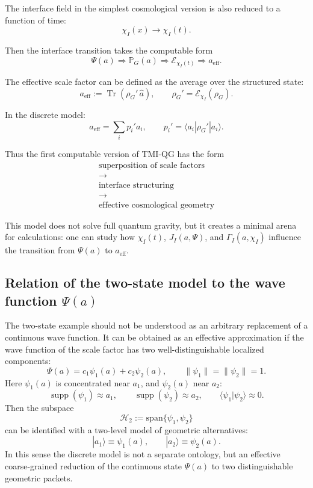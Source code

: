 \documentclass[12pt,a4paper]{article}
\DeclareMathOperator{\Tr}{Tr}
\DeclareMathOperator{\supp}{supp}
\newcommand{\Hilb}{\mathcal H}
\newcommand{\Prob}{\mathbb P}
\newcommand{\Eff}{\mathrm{eff}}
\begin{document}
The interface field in the simplest cosmological version is also reduced to a function of time:
\[
\boxed{
\chi_I(x)
\longrightarrow
\chi_I(t).
}
\]

Then the interface transition takes the computable form
\[
\boxed{
\Psi(a)
\Rightarrow
\Prob_G(a)
\Rightarrow
\mathcal E_{\chi_I(t)}
\Rightarrow
 a_{\Eff}.
}
\]

The effective scale factor can be defined as the average over the structured state:
\[
\boxed{
a_{\Eff}
:=
\Tr(\rho_G'\,\widehat a),
\qquad
\rho_G'=\mathcal E_{\chi_I}(\rho_G).
}
\]

In the discrete model:
\[
\boxed{
a_{\Eff}
=
\sum_i p_i' a_i,
\qquad
p_i'=\langle a_i|\rho_G'|a_i\rangle.
}
\]

Thus the first computable version of TMI-QG has the form
\[
\boxed{
\begin{gathered}
\text{superposition of scale factors}\\
\longrightarrow\\
\text{interface structuring}\\
\longrightarrow\\
\text{effective cosmological geometry}
\end{gathered}
}
\]

This model does not solve full quantum gravity, but it creates a minimal arena for calculations: one can study how $\chi_I(t)$, $J_I(a,\Psi)$, and $\Gamma_I(a,\chi_I)$ influence the transition from $\Psi(a)$ to $a_{\Eff}$.

\subsection{Relation of the two-state model to the wave function \texorpdfstring{$\Psi(a)$}{Psi(a)}}

The two-state example should not be understood as an arbitrary replacement of a continuous wave function. It can be obtained as an effective approximation if the wave function of the scale factor has two well-distinguishable localized components:
\[
\boxed{
\Psi(a)=c_1\psi_1(a)+c_2\psi_2(a),
\qquad
\|\psi_1\|=\|\psi_2\|=1.
}
\]
Here $\psi_1(a)$ is concentrated near $a_1$, and $\psi_2(a)$ near $a_2$:
\[
\boxed{
\supp(\psi_1)\approx a_1,
\qquad
\supp(\psi_2)\approx a_2,
\qquad
\langle\psi_1|\psi_2\rangle\approx0.
}
\]
Then the subspace
\[
\boxed{
\Hilb_2:=\mathrm{span}\{\psi_1,\psi_2\}
}
\]
can be identified with a two-level model of geometric alternatives:
\[
\boxed{
|a_1\rangle\equiv\psi_1(a),
\qquad
|a_2\rangle\equiv\psi_2(a).
}
\]
In this sense the discrete model is not a separate ontology, but an effective coarse-grained reduction of the continuous state $\Psi(a)$ to two distinguishable geometric packets.
\end{document}
